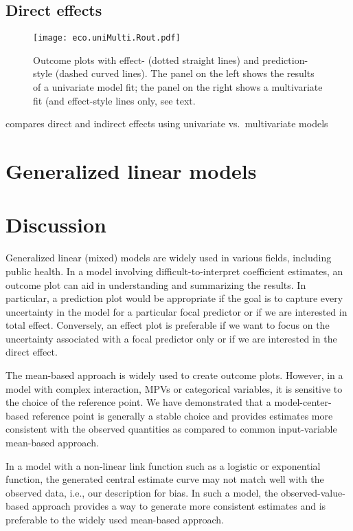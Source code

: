 \subsection{Direct effects}

\begin{figure}
\begin{center}
\texttt{[image: eco.uniMulti.Rout.pdf]}
\end{center}
\caption{Outcome plots with effect- (dotted straight lines) and prediction-style (dashed curved lines). The panel on the left shows the results of a univariate model fit; the panel on the right shows a multivariate fit (and effect-style lines only, see text.}
\end{figure}
 compares direct and indirect effects using univariate vs.~multivariate models

\section{Generalized linear models}

\section{Discussion}

Generalized linear (mixed) models are widely used in various fields, including public health. In a model involving difficult-to-interpret coefficient estimates, an outcome plot can aid in understanding and summarizing the results. In particular, a prediction plot would be appropriate if the goal is to capture every uncertainty in the model for a particular focal predictor or if we are interested in total effect. Conversely, an effect plot is preferable if we want to focus on the uncertainty associated with a focal predictor only or if we are interested in the direct effect.

The mean-based approach is widely used to create outcome plots. However, in a model with complex interaction, MPVs or categorical variables, it is sensitive to the choice of the reference point. We have demonstrated that a model-center-based reference point is generally a stable choice and provides estimates more consistent with the observed quantities as compared to common input-variable mean-based approach.

In a model with a non-linear link function such as a logistic or exponential function, the generated central estimate curve may not match well with the observed data, i.e., our description for bias. In such a model, the observed-value-based approach provides a way to generate more consistent estimates and is preferable to the widely used mean-based approach.

